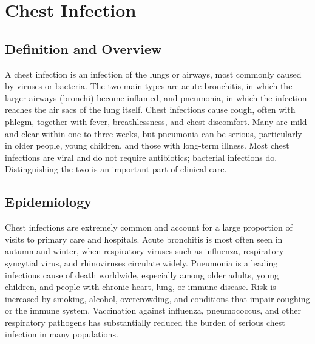 \chapter{Chest Infection}

\section*{Definition and Overview}
A chest infection is an infection of the lungs or airways, most commonly caused by viruses or bacteria. The two main types are acute bronchitis, in which the larger airways (bronchi) become inflamed, and pneumonia, in which the infection reaches the air sacs of the lung itself. Chest infections cause cough, often with phlegm, together with fever, breathlessness, and chest discomfort. Many are mild and clear within one to three weeks, but pneumonia can be serious, particularly in older people, young children, and those with long-term illness. Most chest infections are viral and do not require antibiotics; bacterial infections do. Distinguishing the two is an important part of clinical care.

\section*{Epidemiology}
Chest infections are extremely common and account for a large proportion of visits to primary care and hospitals. Acute bronchitis is most often seen in autumn and winter, when respiratory viruses such as influenza, respiratory syncytial virus, and rhinoviruses circulate widely. Pneumonia is a leading infectious cause of death worldwide, especially among older adults, young children, and people with chronic heart, lung, or immune disease. Risk is increased by smoking, alcohol, overcrowding, and conditions that impair coughing or the immune system. Vaccination against influenza, pneumococcus, and other respiratory pathogens has substantially reduced the burden of serious chest infection in many populations.


